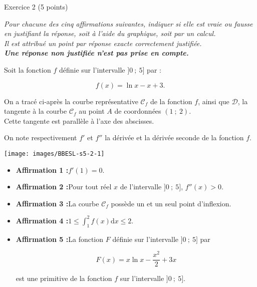 
%
\begin{h2}Exercice 2 (5 points)\end{h2}
\par
\emph{Pour chacune des cinq affirmations suivantes, indiquer si elle est vraie ou fausse en justifiant la réponse, soit à l'aide du graphique, soit par un calcul.\\ Il est attribué un point par réponse exacte correctement justifiée.\\ \textbf{Une réponse non justifiée n'est pas prise en compte.}}
\par
Soit la fonction $f$ définie sur l'intervalle $]0~;~5]$ par :
\par
\[f(x) =  \ln x - x + 3.  \]
\par
On a tracé ci-après la courbe représentative $\mathscr{C}_f$ de la fonction $f$, ainsi que $\mathscr{D}$, la tangente à la courbe $\mathscr{C}_f$ au point $A$ de coordonnées $(1~;~2)$.\\ Cette tangente est parallèle à l'axe des abscisses.
\par
On note respectivement $f'$ et $f''$ la dérivée et la dérivée seconde de la fonction $f$.
\par
\begin{center}
     \begin{extern}%
          \texttt{[image: images/BBESL-s5-2-1]}%
     \end{extern}
\end{center}
\par
\begin{itemize}
     \item %
     \textbf{Affirmation 1 :}\quad $f'(1)=0$.
     \item %
     \textbf{Affirmation 2 :}\quad Pour tout réel $x$ de l'intervalle $]0~;~5]$, $f''(x)>0$.
     \item %
     \textbf{Affirmation 3 :}\quad La courbe $\mathscr{C}_f$ possède un et un seul point d'inflexion.
     \item %
     \textbf{Affirmation 4 :}\quad $1 \leqslant \displaystyle\int_{1}^{2}f(x)\text{d}x \leqslant 2$.
     \item %
     \textbf{Affirmation 5 :}\quad La fonction $F$ définie sur l'intervalle $]0~;~5]$ par
     \par
     \[F(x) =  x\ln x - \dfrac{x^2}{2} + 3x  \]
     \par
     est une primitive de la fonction $f$ sur l'intervalle $]0~;~5]$.
     \par
\end{itemize}
